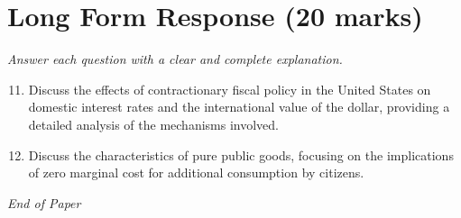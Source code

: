 \documentclass[12pt]{article}
\begin{document}
\section*{Long Form Response (20 marks)}
\textit{Answer each question with a clear and complete explanation.}
\begin{enumerate}[label=\arabic*.]
\setcounter{enumi}{10}
\item Discuss the effects of contractionary fiscal policy in the United States on domestic interest rates and the international value of the dollar, providing a detailed analysis of the mechanisms involved.
\item Discuss the characteristics of pure public goods, focusing on the implications of zero marginal cost for additional consumption by citizens.
\end{enumerate}

\vfill
\noindent\textit{End of Paper}
\end{document}
